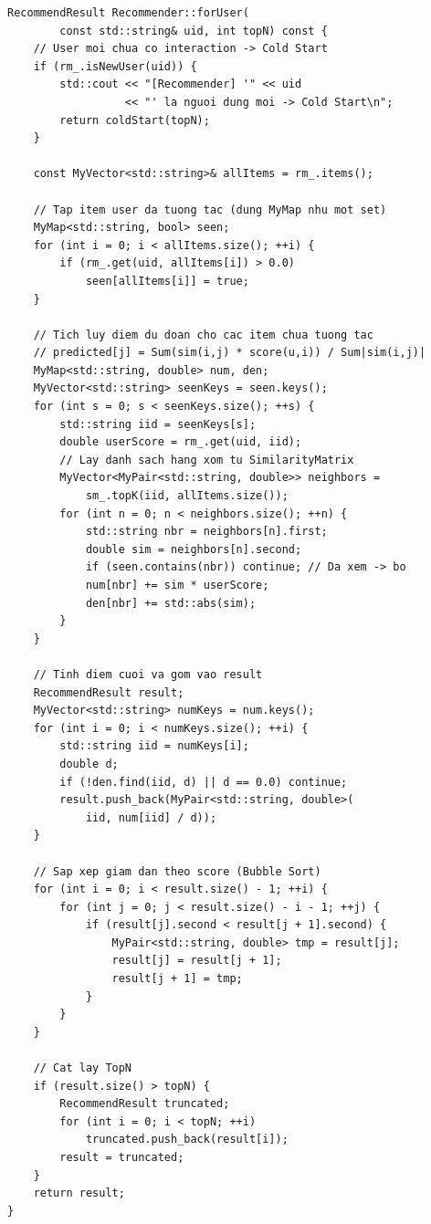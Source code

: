 \documentclass{report}
\begin{document}
\begin{lstlisting}[caption={Hàm forUser() - File 3\_core/Recommender.cpp}, label={lst:for_user}]
RecommendResult Recommender::forUser(
        const std::string& uid, int topN) const {
    // User moi chua co interaction -> Cold Start
    if (rm_.isNewUser(uid)) {
        std::cout << "[Recommender] '" << uid
                  << "' la nguoi dung moi -> Cold Start\n";
        return coldStart(topN);
    }

    const MyVector<std::string>& allItems = rm_.items();

    // Tap item user da tuong tac (dung MyMap nhu mot set)
    MyMap<std::string, bool> seen;
    for (int i = 0; i < allItems.size(); ++i) {
        if (rm_.get(uid, allItems[i]) > 0.0)
            seen[allItems[i]] = true;
    }

    // Tich luy diem du doan cho cac item chua tuong tac
    // predicted[j] = Sum(sim(i,j) * score(u,i)) / Sum|sim(i,j)|
    MyMap<std::string, double> num, den;
    MyVector<std::string> seenKeys = seen.keys();
    for (int s = 0; s < seenKeys.size(); ++s) {
        std::string iid = seenKeys[s];
        double userScore = rm_.get(uid, iid);
        // Lay danh sach hang xom tu SimilarityMatrix
        MyVector<MyPair<std::string, double>> neighbors =
            sm_.topK(iid, allItems.size());
        for (int n = 0; n < neighbors.size(); ++n) {
            std::string nbr = neighbors[n].first;
            double sim = neighbors[n].second;
            if (seen.contains(nbr)) continue; // Da xem -> bo
            num[nbr] += sim * userScore;
            den[nbr] += std::abs(sim);
        }
    }

    // Tinh diem cuoi va gom vao result
    RecommendResult result;
    MyVector<std::string> numKeys = num.keys();
    for (int i = 0; i < numKeys.size(); ++i) {
        std::string iid = numKeys[i];
        double d;
        if (!den.find(iid, d) || d == 0.0) continue;
        result.push_back(MyPair<std::string, double>(
            iid, num[iid] / d));
    }

    // Sap xep giam dan theo score (Bubble Sort)
    for (int i = 0; i < result.size() - 1; ++i) {
        for (int j = 0; j < result.size() - i - 1; ++j) {
            if (result[j].second < result[j + 1].second) {
                MyPair<std::string, double> tmp = result[j];
                result[j] = result[j + 1];
                result[j + 1] = tmp;
            }
        }
    }

    // Cat lay TopN
    if (result.size() > topN) {
        RecommendResult truncated;
        for (int i = 0; i < topN; ++i)
            truncated.push_back(result[i]);
        result = truncated;
    }
    return result;
}
\end{lstlisting}
\end{document}
